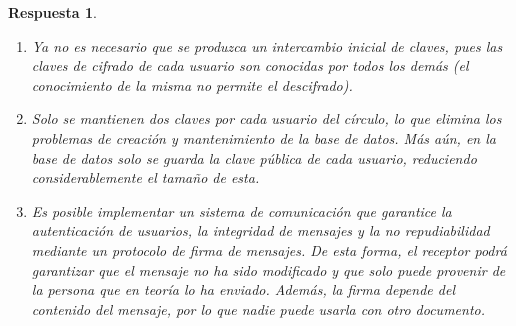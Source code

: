 \documentclass[
  a4paper,
  spanish,
  12pt,
]{scrartcl}
\theoremstyle{ejercicio-style}
\theoremstyle{remark-style}
\newtheorem*{sol}{Respuesta}
\theoremstyle{teorema-style}
\begin{document}
\begin{sol}
\begin{enumerate}
  \item Ya no es necesario que se produzca un intercambio inicial de claves, pues las claves de cifrado de cada usuario son conocidas por todos los demás (el conocimiento de la misma no permite el descifrado).

  \item Solo se mantienen dos claves por cada usuario del círculo, lo que elimina los problemas de creación y mantenimiento de la base de datos. Más aún, en la base de datos solo se guarda la clave pública de cada usuario, reduciendo considerablemente el tamaño de esta.

\item Es posible implementar un sistema de comunicación que garantice la \textit{autenticación} de usuarios, la \textit{integridad} de mensajes y la \textit{no repudiabilidad} mediante un protocolo de firma de mensajes. De esta forma, el receptor podrá garantizar que el mensaje no ha sido modificado y que solo puede provenir de la persona que en teoría lo ha enviado. Además, la firma depende del contenido del mensaje, por lo que nadie puede usarla con otro documento.


\end{enumerate}
\end{sol}
\end{document}

